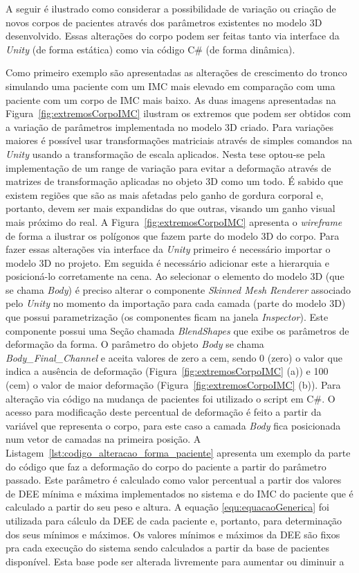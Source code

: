 A seguir é ilustrado como considerar a possibilidade de variação ou criação de novos corpos de pacientes através dos parâmetros existentes no modelo 3D desenvolvido. Essas alterações do corpo podem ser feitas tanto via interface da \textit{Unity} (de forma estática) como via código C\# (de forma dinâmica). 

Como primeiro exemplo são apresentadas as alterações de crescimento do tronco simulando uma paciente com um \acrshort{IMC} mais elevado em comparação com uma paciente com um corpo de \acrshort{IMC} mais baixo. As duas imagens apresentadas na Figura~\ref{fig:extremosCorpoIMC} ilustram os extremos que podem ser obtidos com a variação de parâmetros implementada no modelo 3D criado. Para variações maiores é possível usar transformações matriciais através de simples comandos na \textit{Unity} usando a transformação de escala aplicados. Nesta tese optou-se pela implementação de um range de variação para evitar a deformação através de matrizes de transformação aplicadas no objeto 3D como um todo. É sabido que existem regiões que são as mais afetadas pelo ganho de gordura corporal e, portanto, devem ser mais expandidas do que outras, visando um ganho visual mais próximo do real. A Figura~\ref{fig:extremosCorpoIMC} apresenta o \textit{wireframe} de forma a ilustrar os polígonos que fazem parte do modelo 3D do corpo. Para fazer essas alterações via interface da \textit{Unity} primeiro é necessário importar o modelo 3D no projeto. Em seguida é necessário adicionar este a hierarquia e posicioná-lo corretamente na cena. Ao selecionar o elemento do modelo 3D (que se chama \textit{Body}) é preciso alterar o componente \textit{Skinned Mesh Renderer} associado pelo \textit{Unity} no momento da importação para cada camada (parte do modelo 3D) que possui parametrização (os componentes ficam na janela \textit{Inspector}). Este componente possui uma Seção chamada \textit{BlendShapes} que exibe os parâmetros de deformação da forma. O parâmetro do objeto \textit{Body} se chama \textit{Body\_Final\_Channel} e aceita valores de zero a cem, sendo 0 (zero) o valor que indica a ausência de deformação (Figura~\ref{fig:extremosCorpoIMC} (a)) e 100 (cem) o valor de maior deformação (Figura~\ref{fig:extremosCorpoIMC} (b)). Para alteração via código na mudança de pacientes foi utilizado o script em C\#. O acesso para modificação deste percentual de deformação é feito a partir da variável que representa o corpo, para este caso a camada \textit{Body} fica posicionada num vetor de camadas na primeira posição. A Listagem~\ref{lst:codigo_alteracao_forma_paciente} apresenta um exemplo da parte do código que faz a deformação do corpo do paciente a partir do parâmetro passado. Este parâmetro é calculado como valor percentual a partir dos valores de \acrshort{DEE} mínima e máxima implementados no sistema e do \acrshort{IMC} do paciente que é calculado a partir do seu peso e altura. A equação \ref{equ:equacaoGenerica} foi utilizada para cálculo da \acrshort{DEE} de cada paciente e, portanto, para determinação dos seus mínimos e máximos. Os valores mínimos e máximos da \acrshort{DEE} são fixos pra cada execução do sistema sendo calculados a partir da base de pacientes disponível. Esta base pode ser alterada livremente para aumentar ou diminuir a 